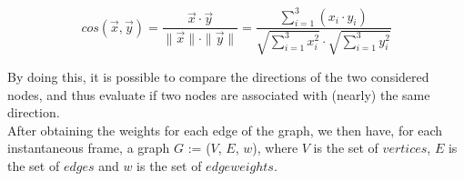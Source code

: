 \begin{equation}  
  cos(\vec{x}, \vec{y}) = \frac{\vec{x} \cdot \vec{y}}{\|\vec{x}\| \cdot \|\vec{y}\|}  =  \frac{\sum_{i=1}^{3} (x_i \cdot y_i)}{\sqrt{\sum_{i=1}^{3} x_i^2} \cdot \sqrt{\sum_{i=1}^{3} y_i^2}}    
\end{equation} 

By doing this, it is possible to compare the directions of the two considered nodes, and thus evaluate if two nodes are associated with (nearly) the same direction. \\ 
After obtaining the weights for each edge of the graph, we then have, for each instantaneous frame, a graph $G$ := ($V$, $E$, $w$), where   
$V$ is the set of $vertices$, $E$ is the set of $edges$ and $w$ is the set of $edge weights$.

%
%
%
